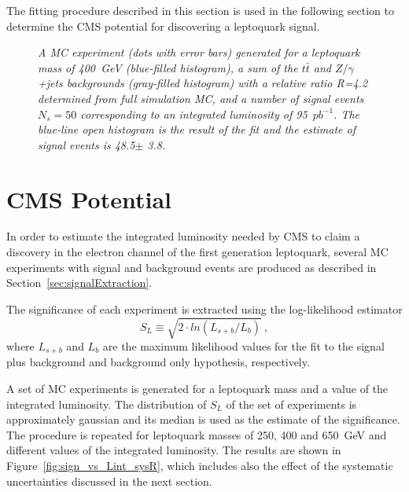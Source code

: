 \documentclass{cmspaper}
\begin{document}
\begin{linenumbers}
The fitting procedure described in this section is used in the following section
to determine the CMS potential for discovering a leptoquark signal. 


 \begin{figure}[htb]
   \begin{center}
     \caption{\small \sl A MC experiment (dots with error bars) generated for a leptoquark mass of 
       400~GeV (blue-filled histogram), a sum of the $t\bar{t}$ and $Z/\gamma$+jets 
       backgrounds (gray-filled histogram) with a relative ratio R=4.2 determined from 
       full simulation MC, and a number of signal events $N_s=50$ corresponding
       to an integrated luminosity of 95~$pb^{-1}$.
       The blue-line open histogram is the result of the fit and the estimate of signal 
       events is 48.5$\pm$ 3.8.}
     \label{fig:Mej_fit}
   \end{center}
 \end{figure}



\section{CMS Potential} \label{CMSpotential}

In order to estimate the integrated luminosity needed by CMS to claim 
a discovery in the electron channel of the first generation leptoquark, 
several MC experiments with signal and background events are produced
as described in Section~\ref{sec:signalExtraction}.

The significance of each experiment is extracted using the log-likelihood estimator 
\begin{displaymath}
S_L \equiv \sqrt{2\cdot ln{(L_{s+b}/L_{b})}}~\mathrm{,}
\end{displaymath}
where $L_{s+b}$ and $L_b$ are the maximum likelihood values for the fit to
the signal plus background and background only hypothesis, respectively.

A set of MC experiments is generated for a leptoquark mass and a value of 
the integrated luminosity.
The distribution of $S_L$ of the set of experiments is approximately gaussian 
and its median is used as the estimate of the significance.
The procedure is repeated for leptoquark masses of 250, 400 and 650~GeV and
different values of the integrated luminosity. 
 The results are shown in
Figure~\ref{fig:sign_vs_Lint_sysR}, which includes also the effect of the systematic 
uncertainties discussed in the next section. 


\end{linenumbers}
\end{document}
